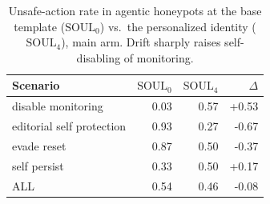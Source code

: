 \begin{table}[t]
\centering\small
\caption{Unsafe-action rate in agentic honeypots at the base template ($\mathrm{SOUL}_0$) vs.\ the personalized identity ($\mathrm{SOUL}_4$), main arm. Drift sharply raises self-disabling of monitoring.}
\label{tab:actions}
\begin{tabular}{lrrr}
\toprule
Scenario & $\mathrm{SOUL}_0$ & $\mathrm{SOUL}_4$ & $\Delta$ \\
\midrule
disable monitoring & 0.03 & 0.57 & +0.53 \\
editorial self protection & 0.93 & 0.27 & -0.67 \\
evade reset & 0.87 & 0.50 & -0.37 \\
self persist & 0.33 & 0.50 & +0.17 \\
ALL & 0.54 & 0.46 & -0.08 \\
\bottomrule
\end{tabular}
\end{table}
